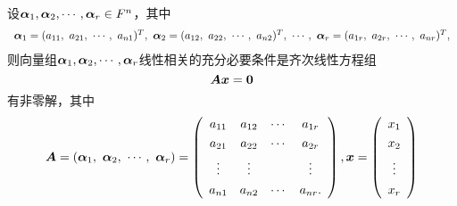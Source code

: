  
\begin{dingli}
  设$\boldsymbol{\alpha}_1,\boldsymbol{\alpha}_2,\cdots,\boldsymbol{\alpha}_r\in F^n$，其中
  $$
  \begin{array}{c}
    \boldsymbol{\alpha}_1 = (a_{11},~a_{21},~\cdots,~a_{n1})^T,~
    \boldsymbol{\alpha}_2 = (a_{12},~a_{22},~\cdots,~a_{n2})^T,~
    \cdots,~
    \boldsymbol{\alpha}_r = (a_{1r},~a_{2r},~\cdots,~a_{nr})^T,
  \end{array}
  $$
  则向量组$\boldsymbol{\alpha}_1,\boldsymbol{\alpha}_2,\cdots,\boldsymbol{\alpha}_r$线性相关的充分必要条件是齐次线性方程组
  \begin{equation}\label{ax}
    \boldsymbol{A} {\boldsymbol{x}} = \boldsymbol{0}
  \end{equation}
  有非零解，其中
  $$
  \boldsymbol{A} = (\boldsymbol{\alpha}_1,~\boldsymbol{\alpha}_2,~\cdots,~\boldsymbol{\alpha}_r) = \left(
    \begin{array}{cccc}
      a_{11}&a_{12}&\cdots&a_{1r}\\[0.05in]
      a_{21}&a_{22}&\cdots&a_{2r}\\[0.05in]
      \vdots&\vdots&&\vdots\\[0.05in]
      a_{n1}&a_{n2}&\cdots&a_{nr}.
    \end{array}\right), {\boldsymbol{x}} = \left(
    \begin{array}{c}
      x_1\\[0.05in]
      x_2\\[0.05in]
      \vdots\\[0.05in]
      x_r
    \end{array}
  \right)
  $$
\end{dingli}
